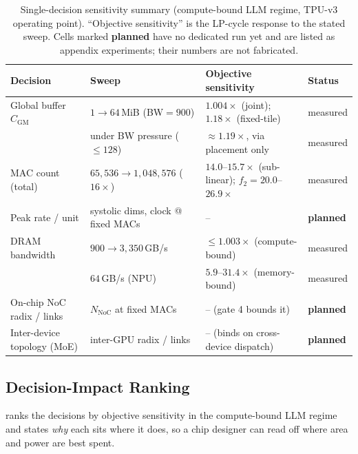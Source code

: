\begin{table}[ht!]
\centering
\caption{Single-decision sensitivity summary (compute-bound LLM regime, TPU-v3
operating point). ``Objective sensitivity'' is the LP-cycle response to the
stated sweep. Cells marked \textcolor{orange!85!black}{\textbf{planned}} have no
dedicated run yet and are listed as appendix experiments; their numbers are not
fabricated.}
\label{tab:deficit_sweepsummary}
\small
\begin{tabular}{@{}llll@{}}
\toprule
\textbf{Decision} & \textbf{Sweep} & \textbf{Objective sensitivity} & \textbf{Status} \\
\midrule
Global buffer $C_{\mathrm{GM}}$ & $1\to64$\,MiB (BW$=900$)
& $1.004\times$ (joint); $1.18\times$ (fixed-tile) & measured \\
& under BW pressure ($\le128$) & $\approx1.19\times$, via placement only & measured \\
MAC count (total) & $65{,}536\to1{,}048{,}576$ ($16\times$)
& $14.0$--$15.7\times$ (sub-linear); $f_2=20.0$--$26.9\times$ & measured \\
Peak rate / unit & systolic dims, clock @ fixed MACs
& -- & \textcolor{orange!85!black}{\textbf{planned}} \\
DRAM bandwidth & $900\to3{,}350$\,GB/s & $\le1.003\times$ (compute-bound) & measured \\
& $64$\,GB/s (NPU) & $5.9$--$31.4\times$ (memory-bound) & measured \\
On-chip NoC radix / links & $N_{\mathrm{NoC}}$ at fixed MACs
& -- (gate 4 bounds it) & \textcolor{orange!85!black}{\textbf{planned}} \\
Inter-device topology (MoE) & inter-GPU radix / links
& -- (binds on cross-device dispatch) & \textcolor{orange!85!black}{\textbf{planned}} \\
\bottomrule
\end{tabular}
\end{table}

\subsection{Decision-Impact Ranking}
\label{app:deficit:ranking}

 ranks the decisions by objective sensitivity in the
compute-bound LLM regime and states \emph{why} each sits where it does, so a
chip designer can read off where area and power are best spent.

